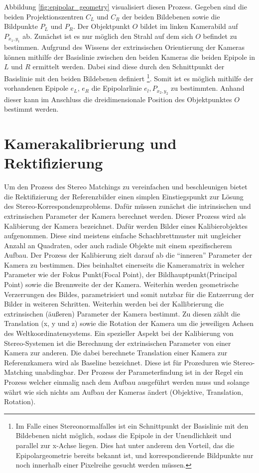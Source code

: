 \noindent
Abbildung \ref{fig:epipolar_geometry} visualisiert diesen Prozess. Gegeben sind die beiden Projektionszentren $C_L$ und $C_R$ der beiden Bildebenen sowie die Bildpunkte $P_L$ und $P_R$. Der Objektpunkt $O$ bildet im linken Kamerabild auf $P_{x_1,y_1}$ ab. Zunächst ist es nur möglich den Strahl auf dem sich $O$ befindet zu bestimmen. Aufgrund des Wissens der extrinsischen Orientierung der Kameras können mithilfe der Basislinie zwischen den beiden Kameras die beiden Epipole in $L$ und $R$ ermittelt werden. Dabei sind diese durch den Schnittpunkt der Basislinie mit den beiden Bildebenen definiert \footnote{Im Falle eines Stereonormalfalles ist ein Schnittpunkt der Basislinie mit den Bildebenen nicht möglich, sodass die Epipole in der Unendlichkeit und parallel zur x-Achse liegen. Dies hat unter anderem den Vorteil, das die Epipolargeometrie bereits bekannt ist, und korrespondierende Bildpunkte nur noch innerhalb einer Pixelreihe gesucht werden müssen.}. Somit ist es möglich mithilfe der vorhandenen Epipole $e_L$, $e_R$ die Epipolarlinie $e_l,P_{x_2,y_2}$ zu bestimmten. Anhand dieser kann im Anschluss die dreidimensionale Position des Objektpunktes $O$ bestimmt werden.

\section{Kamerakalibrierung und Rektifizierung}
\label{sec:camera_calibration}
Um den Prozess des Stereo Matchings zu vereinfachen und beschleunigen bietet die Rektifizierung der Referenzbilder einen simplen Einstiegspunkt zur Lösung des Stereo-Korrespondenzproblems. Dafür müssen zunächst die intrinsischen und extrinsischen Parameter der Kamera berechnet werden. Dieser Prozess wird als Kalibierung der Kamera bezeichnet. Dafür werden Bilder eines Kalibierobjektes aufgenommen. Diese sind meistens einfache Schachbrettmuster mit ungleicher Anzahl an Quadraten, oder auch radiale Objekte mit einem spezifischerem Aufbau. Der Prozess der Kalibierung zielt darauf ab die \enquote{inneren} Parameter der Kamera zu bestimmen. Dies beinhaltet einerseits die Kameramatrix in welcher Parameter wie der Fokus Punkt(Focal Point), der Bildhauptpunkt(Principal Point) sowie die Brennweite der der Kamera. Weiterhin werden geometrische Verzerrungen des Bildes,  parametrisiert und somit nutzbar für die Entzerrung der Bilder in weiteren Schritten. Weiterhin werden bei der Kallibrierung die extrinsischen (äußeren) Parameter der Kamera bestimmt. Zu diesen zählt die Translation (x, y und z) sowie die Rotation der Kamera um die jeweiligen Achsen des Weltkoordinatensystems. Ein spezieller Aspekt bei der Kalibierung von Stereo-Systemen ist die Berechnung der extrinsischen Parameter von einer Kamera zur anderen. Die dabei berechnete Translation einer Kamera zur Referenzkamera wird als Baseline bezeichnet. Diese ist für Prozeduren wie Stereo-Matching unabdingbar. Der Prozess der Parameterfindung ist in der Regel ein Prozess welcher einmalig nach dem Aufbau ausgeführt werden muss und solange währt wie sich nichts am Aufbau der Kameras ändert (Objektive, Translation, Rotation).\\

